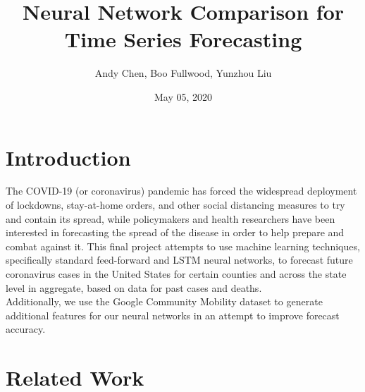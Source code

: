 ﻿\documentclass{article}
\title{Neural Network Comparison for Time Series Forecasting}
\author{Andy Chen, Boo Fullwood, Yunzhou Liu}
\date{May 05, 2020}
\begin{document}
\maketitle

\begin{multicols}{2}
  
\section*{Introduction}

The COVID-19 (or coronavirus) pandemic has forced the widespread deployment of
lockdowns, stay-at-home orders, and other social distancing measures to try and
contain its spread, while policymakers and health researchers have been
interested in forecasting the spread of the disease in order to help prepare and
combat against it. This final project attempts to use machine learning
techniques, specifically standard feed-forward and LSTM neural networks, to
forecast future coronavirus cases in the United States for certain counties and
across the state level in aggregate, based on data for past cases and deaths.\\
Additionally, we use the Google Community Mobility dataset to generate
additional features for our neural networks in an attempt to improve forecast
accuracy.

\section*{Related Work}



\end{multicols}
\end{document}

